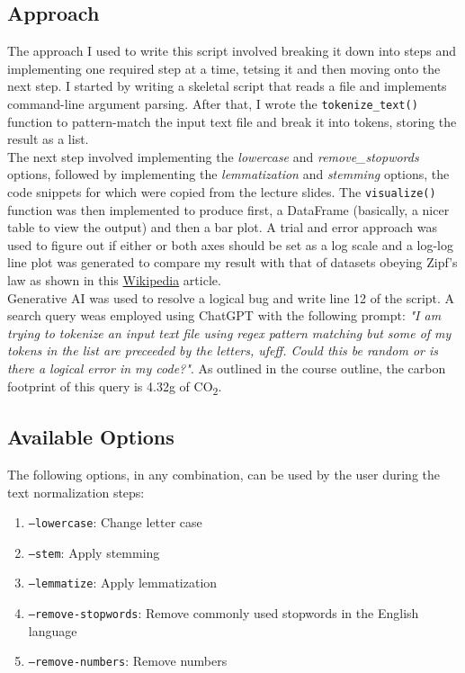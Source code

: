 \documentclass[titlepage]{article}
\begin{document}
\subsection{Approach}
The approach I used to write this script involved breaking it down into steps and implementing 
one required step at a time, tetsing it and then moving onto the next step. I started by writing 
a skeletal script that reads a file and implements command-line argument parsing. After that,
I wrote the \texttt{tokenize\_text()} function to pattern-match the input text file and break it
into tokens, storing the result as a list.\\

The next step involved implementing the \emph{lowercase} and \emph{remove\_stopwords}
options, followed by implementing the \emph{lemmatization} and \emph{stemming} options, the
code snippets for which were copied from the lecture slides. The \texttt{visualize()} function 
was then implemented to produce first, a DataFrame (basically, a nicer table to view the output)
and then a bar plot. A trial and error approach was used to figure out if either or both axes 
should be set as a log scale and a log-log line plot was generated to compare my result with 
that of datasets obeying Zipf's law as shown in this 
\href{https://en.wikipedia.org/wiki/Zipf's_law}{Wikipedia} article.\\

Generative AI was used to resolve a logical bug and write line 12 of the script.
A search query weas employed using ChatGPT with the following prompt: \emph{
"I am trying to tokenize an input text file using regex pattern matching but some of 
my tokens in the list are preceeded by the letters, ufeff. Could this be random or is there a 
logical error in my code?"}. As outlined in the course outline, the carbon footprint of this
query is 4.32g of CO\textsubscript{2}.

\subsection{Available Options}
The following options, in any combination, can be used by the user during the text normalization 
steps:
\begin{enumerate}
    \item \texttt{--lowercase}: Change letter case
    \item \texttt{--stem}: Apply stemming
    \item \texttt{--lemmatize}: Apply lemmatization
    \item \texttt{--remove-stopwords}: Remove commonly used stopwords in the English language
    \item \texttt{--remove-numbers}: Remove numbers 
\end{enumerate}
\end{document}
